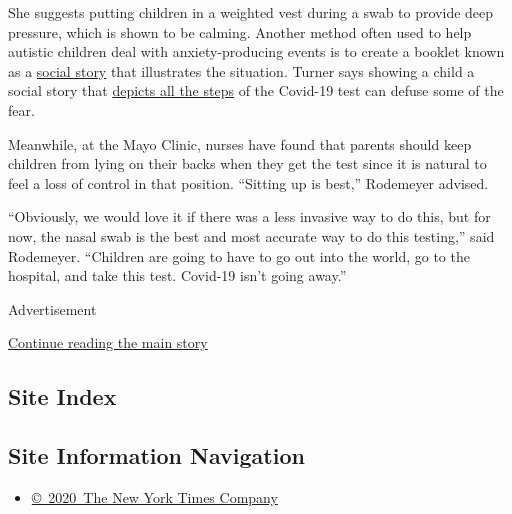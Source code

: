 She suggests putting children in a weighted vest during a swab to
provide deep pressure, which is shown to be calming. Another method
often used to help autistic children deal with anxiety-producing events
is to create a booklet known as a
\href{https://www.massgeneral.org/assets/MGH/pdf/children/lurie-center-nose-test-social-story.pdf}{social
story} that illustrates the situation. Turner says showing a child a
social story that
\href{https://www.healthymindcentre.com.au/covid19story}{depicts all the
steps} of the Covid-19 test can defuse some of the fear.

Meanwhile, at the Mayo Clinic, nurses have found that parents should
keep children from lying on their backs when they get the test since it
is natural to feel a loss of control in that position. ``Sitting up is
best,'' Rodemeyer advised.

``Obviously, we would love it if there was a less invasive way to do
this, but for now, the nasal swab is the best and most accurate way to
do this testing,'' said Rodemeyer. ``Children are going to have to go
out into the world, go to the hospital, and take this test. Covid-19
isn't going away.''

Advertisement

\protect\hyperlink{after-bottom}{Continue reading the main story}

\hypertarget{site-index}{%
\subsection{Site Index}\label{site-index}}

\hypertarget{site-information-navigation}{%
\subsection{Site Information
Navigation}\label{site-information-navigation}}

\begin{itemize}
\tightlist
\item
  \href{https://help.nytimes.com/hc/en-us/articles/115014792127-Copyright-notice}{©~2020~The
  New York Times Company}
\end{itemize}

